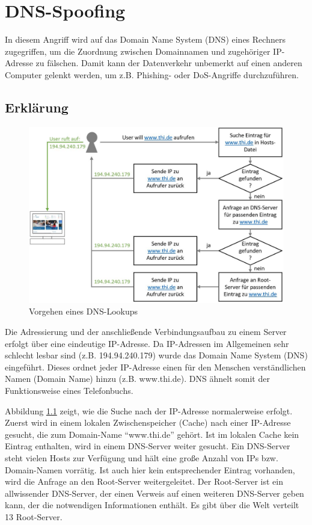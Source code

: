 \chapter{DNS-Spoofing}
In diesem Angriff wird auf das Domain Name System (DNS) eines Rechners zugegriffen, um die Zuordnung zwischen Domainnamen und zugehöriger IP-Adresse zu fälschen. Damit kann der Datenverkehr unbemerkt auf einen anderen Computer gelenkt werden, um z.B. Phishing- oder DoS-Angriffe durchzuführen.

\section{Erklärung}
\begin{figure}[H]
	\centering
	\includegraphics[width=\textwidth]{images/dns_spoofing/normal_dns_lookup.jpg}
	\caption{Vorgehen eines DNS-Lookups}
	\label{fig:normal_dns_lookup}
\end{figure}

Die Adressierung und der anschließende Verbindungsaufbau zu einem Server erfolgt über eine eindeutige IP-Adresse. Da IP-Adressen im Allgemeinen sehr schlecht lesbar sind (z.B. 194.94.240.179) wurde das Domain Name System (DNS) eingeführt. Dieses ordnet jeder IP-Adresse einen für den Menschen verständlichen Namen (Domain Name) hinzu (z.B. www.thi.de). DNS ähnelt somit der Funktionsweise eines Telefonbuchs.

Abbildung \ref{fig:normal_dns_lookup} zeigt, wie die Suche nach der IP-Adresse normalerweise erfolgt. Zuerst wird in einem lokalen Zwischenspeicher (Cache) nach einer IP-Adresse gesucht, die zum Domain-Name \enquote{www.thi.de} gehört. Ist im lokalen Cache kein Eintrag enthalten, wird in einem DNS-Server weiter gesucht. Ein DNS-Server steht vielen Hosts zur Verfügung und hält eine große Anzahl von IPs bzw. Domain-Namen vorrätig. Ist auch hier kein entsprechender Eintrag vorhanden, wird die Anfrage an den Root-Server weitergeleitet. Der Root-Server ist ein allwissender DNS-Server, der einen Verweis auf einen weiteren DNS-Server geben kann, der die notwendigen Informationen enthält. Es gibt über die Welt verteilt 13 Root-Server.

